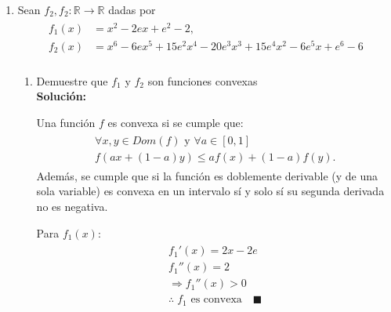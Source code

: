 \documentclass[10pt,letterpaper]{article}
\begin{document}
    \begin{enumerate}
        \item Sean $f_2, f_2: \mathbb{R} \rightarrow \mathbb{R}$ dadas por
            \begin{equation*} \begin{split} \begin{aligned}
                f_1(x) &= x^2 - 2ex + e^2 - 2, \\
                f_2(x) &= x^6 - 6ex^5 + 15e^2x^4 - 20e^3x^3 + 15e^4x^2 - 6e^5x + e^6 - 6 \\
            \end{aligned} \end{split} \end{equation*}

            \begin{enumerate}
                \item Demuestre que $f_1$ y $f_2$ son funciones convexas \\

                    \textbf{Solución:}

                    Una función $f$ es convexa si se cumple que:
                    \begin{equation*} \begin{split} \begin{gathered}
                        \forall x, y \in Dom(f)  \text{ y } \forall a \in [0, 1] \\
                        f(ax + (1-a)y) \leq af(x) + (1 - a)f(y).
                    \end{gathered} \end{split} \end{equation*}
                    Además, se cumple que si la función es doblemente derivable
                    (y de una sola variable) es convexa en un intervalo sí y solo sí
                    su segunda derivada no es negativa.

                    Para $f_1(x)$:
                    \begin{equation*} \begin{split} \begin{gathered}
                        f_1'(x) = 2x - 2e \\
                        f_1''(x) = 2 \\
                        \Rightarrow f_1''(x) > 0 \\
                        \therefore \; f_1 \text{ es convexa} \quad \blacksquare
                    \end{gathered} \end{split} \end{equation*}


\end{enumerate}
\end{enumerate}
\end{document}
